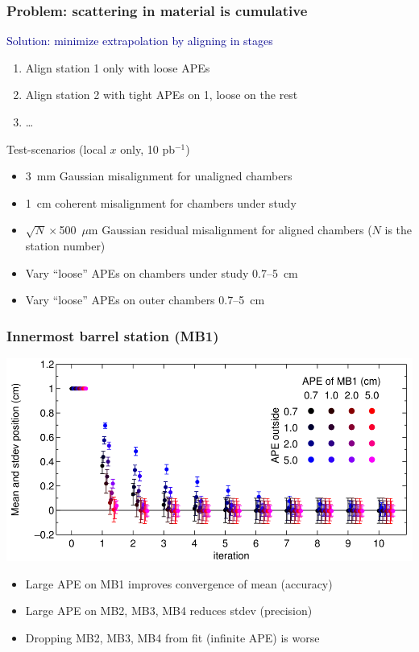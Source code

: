 \documentclass[compress]{beamer}
\begin{document}
\begin{frame}
\frametitle{Problem: scattering in material is cumulative}

\hspace{-0.83 cm} \textcolor{darkblue}{\Large Solution: minimize extrapolation by aligning in stages}
\begin{enumerate}
\item Align station 1 only with loose APEs
\item Align station 2 with tight APEs on 1, loose on the rest
\item \ldots
\end{enumerate}

\vfill Test-scenarios (local $x$ only, 10 pb$^{-1}$) 
\begin{itemize}
\item 3~mm Gaussian misalignment for unaligned chambers
\item 1~cm coherent misalignment for chambers under study
\item $\sqrt{N}\times$500~$\mu$m Gaussian residual misalignment for
aligned chambers ($N$ is the station number)
\item Vary ``loose'' APEs on chambers under study 0.7--5~cm
\item Vary ``loose'' APEs on outer chambers 0.7--5~cm
\end{itemize}
\end{frame}

\begin{frame}
\frametitle{Innermost barrel station (MB1)}
\begin{center}
\includegraphics[width=\linewidth]{mb1_meanstdev.png}
\end{center}

\vspace{-0.5 cm}
\begin{itemize}
\item Large APE on MB1 improves convergence of mean (accuracy)
\item Large APE on MB2, MB3, MB4 reduces stdev (precision)
\item Dropping MB2, MB3, MB4 from fit (infinite APE) is worse
\end{itemize}
\end{frame}
\end{document}
